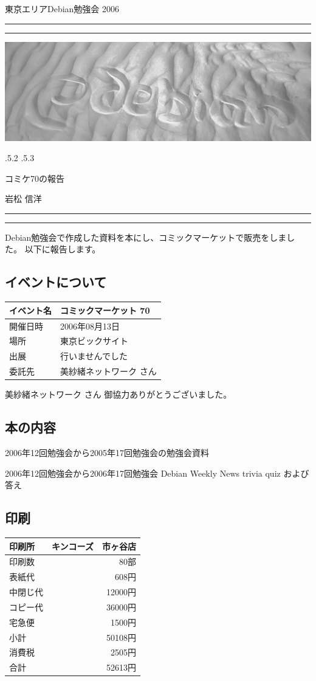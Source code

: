 \documentclass[mingoth,a4paper]{jsarticle}
\makeatletter
\renewcommand{\section}{\@startsection{section}{1}{\z@}%
    {\Cvs \@plus.5\Cdp \@minus.2\Cdp}%
    {.5\Cvs \@plus.3\Cdp}%
    {\normalfont\Huge\headfont\raggedright\centering}} %
\newcommand{\dancersection}[2]{%
\newpage
東京エリアDebian勉強会 2006
\hrule
\vspace{0.5mm}
\hrule
\includegraphics[width=16cm]{image2006-natsu/guruguru-sand-light.png}\\
\vspace{-5cm}
\begin{center}
\section{#1}
\end{center}
\hfill{}\colorbox{white}{#2}\hspace{3cm}\space\\
\vspace{1cm}
\hrule
\vspace{0.5mm}
\hrule
\vspace{1cm}
}
\makeatother
\begin{document}
\dancersection{コミケ70の報告}{岩松 信洋}

Debian勉強会で作成した資料を本にし、コミックマーケットで販売をしました。
以下に報告します。

\subsection{イベントについて}
\begin{tabular}{|l|l|}
\hline 
イベント名 &

	コミックマーケット 70\\
\hline
 開催日時&

	2006年08月13日\\
\hline
 場所 &

	東京ビックサイト\\
\hline
 出展 & 

	行いませんでした\\ 
\hline
 委託先 &

	美紗緒ネットワーク さん\\
\hline
\end{tabular}	

美紗緒ネットワーク さん
	御協力ありがとうございました。

\subsection{本の内容}

	2006年12回勉強会から2005年17回勉強会の勉強会資料

	2006年12回勉強会から2006年17回勉強会 Debian Weekly News trivia quiz および 答え

\subsection{印刷}
\begin{tabular}{|l|r|}
 
 \hline 印刷所 &
		キンコーズ　市ヶ谷店\\
 \hline 印刷数 &

		80部\\
 \hline 表紙代 &

		608円\\
 \hline 中閉じ代 &

		12000円\\
 \hline コピー代 &

		36000円\\
 \hline 宅急便 &

		1500円\\
 \hline 小計 &

		50108円\\
 \hline 消費税 & 

		2505円\\
 \hline 合計 &
	
		52613円\\
\hline
\end{tabular}
\end{document}
